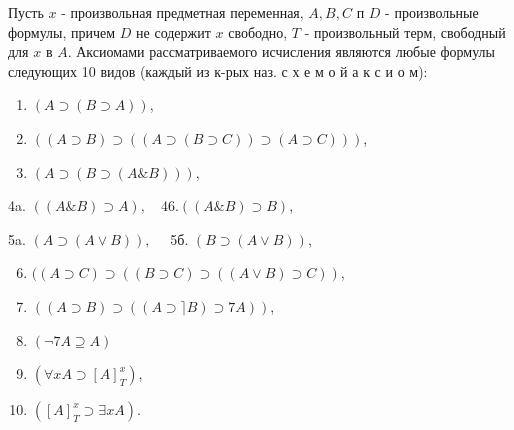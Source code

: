 \documentclass[10pt]{article}
\begin{document}
Пусть $x$ - произвольная предметная переменная, $A, B, C$ п $D$ - произвольные формулы, причем $D$ не содержит $x$ свободно, $T$ - произвольный терм, свободный для $x$ в $A$. Аксиомами рассматриваемого исчисления являются любые формулы следующих 10 видов (каждый из к-рых наз. с х е м о й а к с и о м):



\begin{enumerate}

  \item $(A \supset(B \supset A))$,



  \item $((A \supset B) \supset((A \supset(B \supset C)) \supset(A \supset C)))$,



  \item $(A \supset(B \supset(A \& B)))$,



\end{enumerate}



4a. $((A \& B) \supset A), \quad 46 .((A \& B) \supset B)$,



5a. $(A \supset(A \vee B)), \quad$ 5б. $(B \supset(A \vee B))$,



\begin{enumerate}

  \setcounter{enumi}{5}

  \item $((A \supset C) \supset((B \supset C) \supset((A \vee B) \supset C))$,



  \item $((A \supset B) \supset((A \supset\rceil B) \supset 7 A))$,



  \item $(\neg 7 A \supseteq A)$



  \item $\left(\forall x A \supset[A]_{T}^{x}\right)$,



  \item $\left([A]_{T}^{x} \supset \exists x A\right)$.



\end{enumerate}
\end{document}
